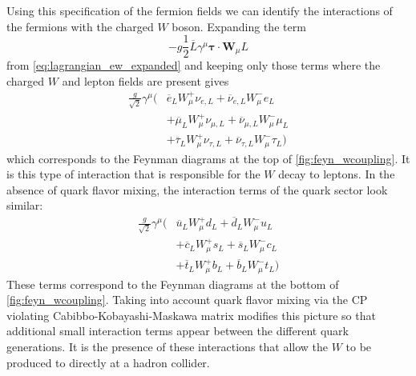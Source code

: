 Using this specification of the fermion fields 
we can identify the interactions of the fermions with the 
charged $W$ boson.  Expanding the term 
\begin{equation}
-g \frac{1}{2} \overline{L}\gamma^{\mu}\boldsymbol{\tau} \cdot \textbf{W}_{\mu} L 
\end{equation}
from \eqn\eqref{eq:lagrangian_ew_expanded}
and keeping only those
terms where the charged $W$ and lepton fields are present gives
\begin{equation}
\begin{aligned}
\frac{g}{\sqrt{2}}\gamma^{\mu}\Big( &
\overline{e}_L W_{\mu}^+ \nu_{e,L} +
\overline{\nu}_{e,L} W^-_{\mu} e_L \\&+
\overline{\mu}_L W_{\mu}^+ \nu_{\mu,L} +
\overline{\nu}_{\mu,L} W^-_{\mu} \mu_L \\&+
\overline{\tau}_L W_{\mu}^+ \nu_{\tau,L} +
\overline{\nu}_{\tau,L} W^-_{\mu} \tau_L \Big)
\end{aligned}
\label{eq:couplings_wleptons}
\end{equation}
which corresponds to the Feynman diagrams at the top
of \fig\ref{fig:feyn_wcoupling}. It is this
type of interaction that is responsible for the $W$ decay to leptons.
In the absence of quark flavor mixing, the interaction terms 
of the quark sector look similar:
\begin{equation}
\begin{aligned}
\frac{g}{\sqrt{2}}\gamma^{\mu}\Big( &
\overline{u}_L W_{\mu}^+ d_{L} +
\overline{d}_{L} W^-_{\mu} u_L \\&+
\overline{c}_L W_{\mu}^+ s_{L} +
\overline{s}_{L} W^-_{\mu} c_L \\&+
\overline{t}_L W_{\mu}^+ b_{L} +
\overline{b}_{L} W^-_{\mu} t_L \Big)
\end{aligned}
\end{equation}
These terms correspond to the Feynman diagrams at the bottom
of \fig\ref{fig:feyn_wcoupling}.
Taking into account quark flavor mixing via the 
CP violating \cite{PhysRevLett.13.138} Cabibbo-Kobayashi-Maskawa
matrix \cite{Cabibbo:1963yz,Kobayashi:1973fv}
modifies this picture so that additional small interaction
terms appear between the different quark generations.
It is the presence of these interactions that allow the $W$ 
to be produced to directly at a hadron collider.


